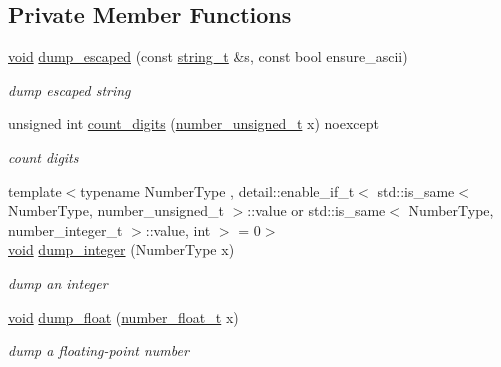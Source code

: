 \subsection*{Private Member Functions}
\begin{DoxyCompactItemize}
\item 
\mbox{\hyperlink{namespacenlohmann_1_1detail_a59fca69799f6b9e366710cb9043aa77d}{void}} \mbox{\hyperlink{classnlohmann_1_1detail_1_1serializer_ac1f8d1165b44149bd8be397dce68ea05}{dump\+\_\+escaped}} (const \mbox{\hyperlink{classnlohmann_1_1detail_1_1serializer_ad08aa54fac1dd0a453320c54137d45ba}{string\+\_\+t}} \&s, const bool ensure\+\_\+ascii)
\begin{DoxyCompactList}\small\item\em dump escaped string \end{DoxyCompactList}\item 
unsigned int \mbox{\hyperlink{classnlohmann_1_1detail_1_1serializer_a10692e98ea1f5a64de1d0b8e0e724b99}{count\+\_\+digits}} (\mbox{\hyperlink{classnlohmann_1_1detail_1_1serializer_a16c7b7a726a38ff0c06dce7ba7968391}{number\+\_\+unsigned\+\_\+t}} x) noexcept
\begin{DoxyCompactList}\small\item\em count digits \end{DoxyCompactList}\item 
{\footnotesize template$<$typename Number\+Type , detail\+::enable\+\_\+if\+\_\+t$<$ std\+::is\+\_\+same$<$ Number\+Type, number\+\_\+unsigned\+\_\+t $>$\+::value or std\+::is\+\_\+same$<$ Number\+Type, number\+\_\+integer\+\_\+t $>$\+::value, int $>$  = 0$>$ }\\\mbox{\hyperlink{namespacenlohmann_1_1detail_a59fca69799f6b9e366710cb9043aa77d}{void}} \mbox{\hyperlink{classnlohmann_1_1detail_1_1serializer_a944f6dea8dbe2961da145d2f62fa2c2f}{dump\+\_\+integer}} (Number\+Type x)
\begin{DoxyCompactList}\small\item\em dump an integer \end{DoxyCompactList}\item 
\mbox{\hyperlink{namespacenlohmann_1_1detail_a59fca69799f6b9e366710cb9043aa77d}{void}} \mbox{\hyperlink{classnlohmann_1_1detail_1_1serializer_a6d652a3bfa581cf1cd7790d6d11ea52f}{dump\+\_\+float}} (\mbox{\hyperlink{classnlohmann_1_1detail_1_1serializer_a460c6794fbabbb2ae83380e987a6c030}{number\+\_\+float\+\_\+t}} x)
\begin{DoxyCompactList}\small\item\em dump a floating-\/point number \end{DoxyCompactList}\item 

\end{DoxyCompactItemize}
